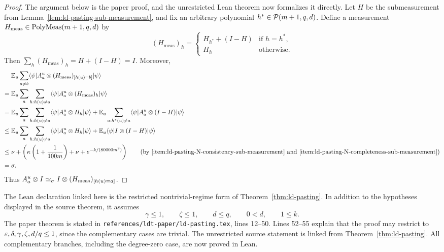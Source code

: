 \begin{proof}
	\leanok
	The argument below is the paper proof, and the unrestricted Lean theorem now
	formalizes it directly.
	Let $H$ be the submeasurement from Lemma~\ref{lem:ld-pasting-sub-measurement}, and fix an arbitrary polynomial $h^* \in \mathcal{P}(m+1,q,d)$. Define a measurement $H_{\mathrm{meas}} \in \mathrm{PolyMeas}(m+1,q,d)$ by
	\[
		(H_{\mathrm{meas}})_h
		=
		\begin{cases}
			H_{h^*} + (I-H) & \text{if } h=h^*, \\
			H_h             & \text{otherwise.}
		\end{cases}
	\]
	Then $\sum_h (H_{\mathrm{meas}})_h = H + (I-H) = I$. Moreover,
	\begin{align*}
		      & \E_u \sum_{a \ne b} \bra{\psi} A_a^u \ot (H_{\mathrm{meas}})_{[h(u)=b]} \ket{\psi}                            \\
		={}   & \E_u \sum_a \sum_{h:h(u)\ne a} \bra{\psi} A_a^u \ot (H_{\mathrm{meas}})_h \ket{\psi}                          \\
		={}   & \E_u \sum_a \sum_{h:h(u)\ne a} \bra{\psi} A_a^u \ot H_h \ket{\psi}
		+ \E_u \sum_{a:h^*(u)\ne a} \bra{\psi} A_a^u \ot (I-H) \ket{\psi}                                                     \\
		\le{} & \E_u \sum_a \sum_{h:h(u)\ne a} \bra{\psi} A_a^u \ot H_h \ket{\psi}
		+ \E_u \bra{\psi} I \ot (I-H) \ket{\psi}                                                                              \\
		\le{} & \nu + \left(\kappa\left(1+\frac{1}{100m}\right) + \nu + e^{-k/(80000m^2)}\right)
		\tag{by \ref{item:ld-pasting-N-consistency-sub-measurement} and \ref{item:ld-pasting-N-completeness-sub-measurement}} \\
		={}   & \sigma.
	\end{align*}
	Thus $A_a^u \otimes I \simeq_\sigma I \otimes (H_{\mathrm{meas}})_{[h(u)=a]}$.
\end{proof}

\begin{remark}\label{rem:ld-pasting-restricted-lean-form}
	The Lean declaration linked here is the restricted nontrivial-regime form of
	Theorem~\ref{thm:ld-pasting}.  In addition to the hypotheses displayed in the
	source theorem, it assumes
	\[
		\gamma \le 1,\qquad \zeta \le 1,\qquad d \le q,\qquad 0<d,\qquad 1\le k.
	\]
	The paper theorem is stated in
	\texttt{references/ldt-paper/ld-pasting.tex}, lines 12--50.  Lines 52--55
	explain that the proof may restrict to
	\(\varepsilon,\delta,\gamma,\zeta,d/q\le 1\), since the complementary cases are
	trivial.  The unrestricted source statement is linked from
	Theorem~\ref{thm:ld-pasting}.  All complementary branches, including the
	degree-zero case, are now proved in Lean.
\end{remark}


